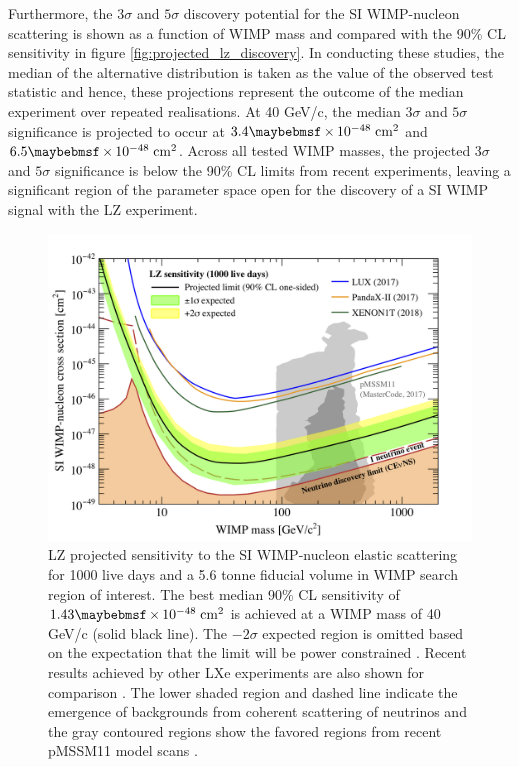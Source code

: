 {Furthermore, the $3\sigma$ and $5\sigma$ discovery potential for the SI WIMP-nucleon scattering is shown as a function of WIMP mass and compared with the 90\% CL sensitivity in figure \ref{fig:projected_lz_discovery}. In conducting these studies, the median of the alternative distribution is taken as the value of the observed test statistic and hence, these projections represent the outcome of the median experiment over repeated realisations. At 40 GeV/c\squared{}, the median $3\sigma$ and $5\sigma$ significance is projected to occur at $3.4 \times 10^{-48} \; \MathText{cm}^2$ and $6.5 \times 10^{-48} \; \MathText{cm}^2$. Across all tested WIMP masses, the projected $3\sigma$ and $5\sigma$ significance is below the 90\% CL limits from recent experiments, leaving a significant region of the parameter space open for the discovery of a SI WIMP signal with the LZ experiment.

%
\begin{figure}[h!]
    \centering
    \includegraphics[scale=0.8]{Chapter_5/Figures/sensitivity_studies/lz_projection_1000_day.png}
    \caption[LZ projected sensitivity to the SI WIMP-nucleon elastic scattering for 1000 live days and a 5.6 tonne fiducial volume in WIMP search region of interest.]%
    {LZ projected sensitivity to the SI WIMP-nucleon elastic scattering for 1000 live days and a 5.6 tonne fiducial volume in WIMP search region of interest. The best median 90\% CL sensitivity of $1.43 \times 10^{-48} \; \MathText{cm}^2$ is achieved at a WIMP mass of 40 GeV/c\squared{} (solid black line). The $-2\sigma$ expected region is omitted based on the expectation that the limit will be power constrained \cite{Cowan:2011an}. Recent results achieved by other LXe experiments are also shown for comparison \cite{lux_full, xenon_1t, pandax_limit}. The lower shaded region and dashed line indicate the emergence of backgrounds from coherent scattering of neutrinos \cite{neutrino_floor} and the gray contoured regions show the favored regions from recent pMSSM11 model scans \cite{pMSSM11}.}
    \label{fig:projected_lz_sensitivity}
\end{figure}
%

}
